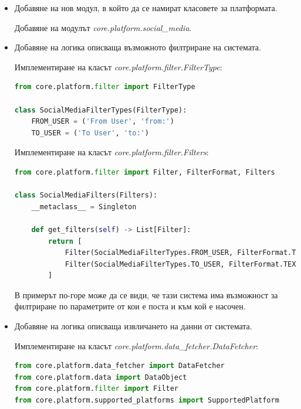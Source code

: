 \documentclass{article}
\begin{document}
\begin{itemize}
  \item Добавяне на нов модул, в който да се намират класовете за платформата.

  Добавяне на модулът \textit{core.platform.social\_media}.

  \item Добавяне на логика описваща възможното филтриране на системата.

  Имплементиране на класът \textit{core.platform.filter.FilterType}:

\begin{lstlisting}[language=Python, caption=Дефиниция на типовете филтри на новата социална мрежа.]
from core.platform.filter import FilterType

class SocialMediaFilterTypes(FilterType):
    FROM_USER = ('From User', 'from:')
    TO_USER = ('To User', 'to:')
\end{lstlisting}

  Имплементиране на класът \textit{core.platform.filter.Filters}:

\begin{lstlisting}[language=Python, caption=Дефиниция на подържаните филтри от новата социална мрежа.]
from core.platform.filter import Filter, FilterFormat, Filters

class SocialMediaFilters(Filters):
    __metaclass__ = Singleton

    def get_filters(self) -> List[Filter]:
        return [
            Filter(SocialMediaFilterTypes.FROM_USER, FilterFormat.TEXT),
            Filter(SocialMediaFilterTypes.TO_USER, FilterFormat.TEXT)
        ]
\end{lstlisting}

  В примерът по-горе може да се види, че тази система има възможност за филтриране по параметрите от кои е поста и
  към кой е насочен.

  \item Добавяне на логика описваща извличането на данни от системата.

  Имплементиране на класът \textit{core.platform.data\_fetcher.DataFetcher}:

\begin{lstlisting}[language=Python, caption=Дефиниция на извличането на данни от новата социална мрежа.]
from core.platform.data_fetcher import DataFetcher
from core.platform.data import DataObject
from core.platform.filter import Filter
from core.platform.supported_platforms import SupportedPlatform


\end{lstlisting}
\end{itemize}
\end{document}
